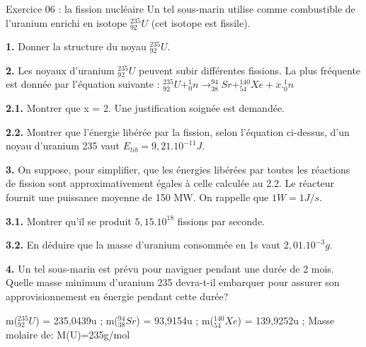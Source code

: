 \documentclass[12pt, french]{article}
\begin{document}
\begin{Box2}{Exercice 06 : la fission nucléaire}
Un tel sous-marin utilise comme combustible de l’uranium enrichi en isotope $^{235}_{92}U$ (cet isotope est fissile).

\textbf{1. } Donner la structure du noyau $^{235}_{92}U$.

\textbf{2. }Les noyaux d’uranium $^{235}_{92}U$ peuvent subir différentes fissions. La plus fréquente est donnée par l’équation suivante : $^{235}_{92}U + ^1_0n \rightarrow ^{94}_{38}Sr + ^{140}_{54}Xe + x.^1_0n$

\textbf{2.1. }Montrer que x = 2. Une justification soignée est demandée.

\textbf{2.2.} Montrer que l’énergie libérée par la fission, selon l’équation ci-dessus, d’un noyau
d’uranium 235 vaut $E_{lib} = 9,21.10^{-11}J$.

\textbf{3. }On suppose, pour simplifier, que les énergies libérées par toutes les réactions de fission sont
approximativement égales à celle calculée au 2.2.
Le réacteur fournit une puissance moyenne de 150 MW. On rappelle que $1W = 1J/s$.

\textbf{3.1.} Montrer qu’il se produit $5,15.10^{18}$ fissions par seconde.

\textbf{3.2.}  En déduire que la masse d’uranium consommée en 1s vaut $2,01 . 10^{-3} g$.

\textbf{4. } Un tel sous-marin est prévu pour naviguer pendant une durée de 2 mois. Quelle masse minimum d’uranium 235 devra-t-il embarquer pour assurer son approvisionnement en
énergie pendant cette durée?

m($^{235}_{92}U$) = 235,0439u ; m($^{94}_{38}Sr$) = 93,9154u  ; m($^{140}_{54}Xe$) = 139,9252u ;  Masse molaire de: M(U)=235g/mol
\end{Box2}
\end{document}
